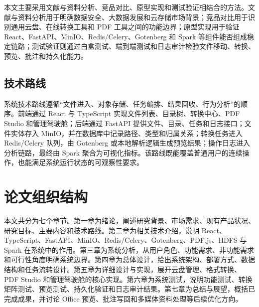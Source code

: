 本文主要采用文献与资料分析、竞品对比、原型实现和测试验证相结合的方法。文献与资料分析用于明确数据安全、大数据发展和云存储市场背景；竞品对比用于识别通用云盘、在线转换工具和 PDF 工具之间的功能边界；原型实现用于验证 React、FastAPI、MinIO、Redis/Celery、Gotenberg 和 Spark 等组件能否组成稳定链路；测试验证则通过白盒测试、端到端测试和日志审计检验文件移动、转换、预览、批注和持久化能力。

\subsection{技术路线}

系统技术路线遵循“文件进入、对象存储、任务编排、结果回收、行为分析”的顺序。前端通过 React 与 TypeScript 实现文件列表、目录树、转换中心、PDF Studio 和管理驾驶舱；后端通过 FastAPI 提供文件、目录、任务和日志接口；文件实体存入 MinIO，并在数据库中记录路径、类型和归属关系；转换任务进入 Redis/Celery 队列，由 Gotenberg 或本地解析逻辑生成预览结果；操作日志进入分析链路，最终由 Spark 聚合为可视化指标。该路线既能覆盖普通用户的连续操作，也能满足系统运行状态的可观察性要求。

\section{论文组织结构}

本文共分为七个章节。第一章为绪论，阐述研究背景、市场需求、现有产品状况、研究目标、主要内容和技术路线。第二章为相关技术介绍，说明 React、TypeScript、FastAPI、MinIO、Redis/Celery、Gotenberg、PDF.js、HDFS 与 Spark 在系统中的作用。第三章为系统分析，从用户角色、功能需求、非功能需求和可行性角度明确系统边界。第四章为总体设计，给出系统架构、部署方式、数据结构和任务流转设计。第五章为详细设计与实现，展开云盘管理、格式转换、PDF Studio 和管理驾驶舱的核心实现。第六章为系统测试，说明功能测试、转换矩阵测试、预览测试、持久化验证和日志审计结果。第七章为总结与展望，概括已完成成果，并讨论 Office 预览、批注写回和多媒体资料处理等后续优化方向。
